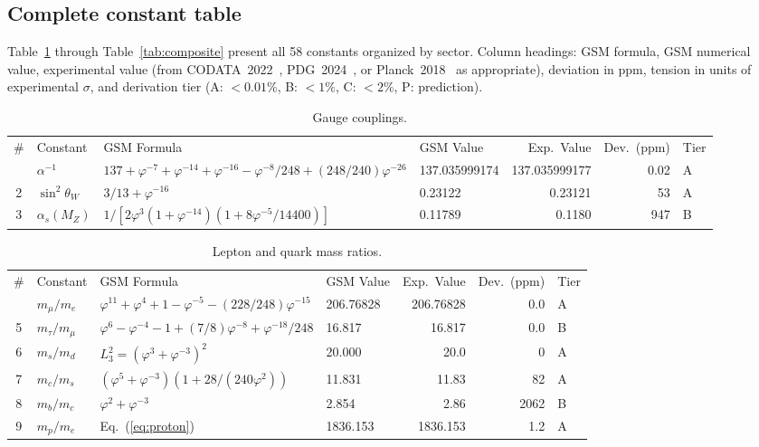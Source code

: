 \documentclass[aps,prd,twocolumn,superscriptaddress,nofootinbib,showpacs]{revtex4-2}
\begin{document}
\subsection{Complete constant table}\label{sec:table}

Table~\ref{tab:gauge} through Table~\ref{tab:composite} present all
58 constants organized by sector.  Column headings: GSM formula, GSM
numerical value, experimental value (from
CODATA~2022~\cite{CODATA2022}, PDG~2024~\cite{PDG2024}, or
Planck~2018~\cite{Planck2018} as appropriate), deviation in ppm,
tension in units of experimental $\sigma$, and derivation tier (A:
${<}0.01\%$, B: ${<}1\%$, C: ${<}2\%$, P: prediction).

\begin{table}[t]
\caption{\label{tab:gauge}Gauge couplings.}
\begin{ruledtabular}
\begin{tabular}{clllrrl}
\# & Constant & GSM Formula & GSM Value & Exp.\ Value & Dev.\ (ppm) & Tier \\
\colrule
1 & $\alpha^{-1}$ & $137 + \varphi^{-7} + \varphi^{-14} + \varphi^{-16} - \varphi^{-8}/248 + (248/240)\varphi^{-26}$ & 137.035999174 & 137.035999177 & 0.02 & A \\
2 & $\sin^2\theta_W$ & $3/13 + \varphi^{-16}$ & 0.23122 & 0.23121 & 53 & A \\
3 & $\alpha_s(M_Z)$ & $1/[2\varphi^3(1+\varphi^{-14})(1+8\varphi^{-5}/14400)]$ & 0.11789 & 0.1180 & 947 & B \\
\end{tabular}
\end{ruledtabular}
\end{table}

\begin{table}[t]
\caption{\label{tab:leptonquark}Lepton and quark mass ratios.}
\begin{ruledtabular}
\begin{tabular}{clllrrl}
\# & Constant & GSM Formula & GSM Value & Exp.\ Value & Dev.\ (ppm) & Tier \\
\colrule
4 & $m_\mu/m_e$ & $\varphi^{11}+\varphi^4+1-\varphi^{-5}-(228/248)\varphi^{-15}$ & 206.76828 & 206.76828 & 0.0 & A \\
5 & $m_\tau/m_\mu$ & $\varphi^6-\varphi^{-4}-1+(7/8)\varphi^{-8}+\varphi^{-18}/248$ & 16.817 & 16.817 & 0.0 & B \\
6 & $m_s/m_d$ & $L_3^2 = (\varphi^3+\varphi^{-3})^2$ & 20.000 & 20.0 & 0 & A \\
7 & $m_c/m_s$ & $(\varphi^5+\varphi^{-3})(1+28/(240\varphi^2))$ & 11.831 & 11.83 & 82 & A \\
8 & $m_b/m_c$ & $\varphi^2+\varphi^{-3}$ & 2.854 & 2.86 & 2062 & B \\
9 & $m_p/m_e$ & Eq.~(\ref{eq:proton}) & 1836.153 & 1836.153 & 1.2 & A \\
\end{tabular}
\end{ruledtabular}
\end{table}
\end{document}

